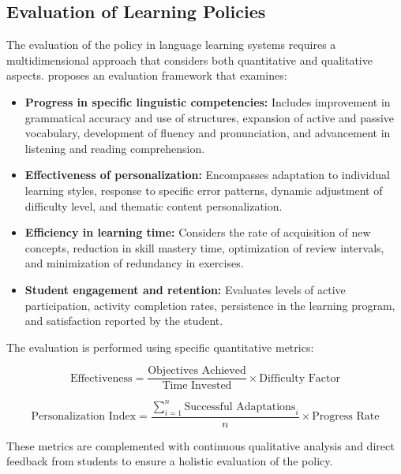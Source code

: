 \subsection{Evaluation of Learning Policies}

The evaluation of the \gls{policy} in language learning systems requires a multidimensional approach that considers both quantitative and qualitative aspects. \cite{williams2017educational} proposes an evaluation framework that examines:

\begin{itemize}
  \item \textbf{Progress in specific linguistic competencies:} Includes improvement in grammatical accuracy and use of structures, expansion of active and passive vocabulary, development of fluency and pronunciation, and advancement in listening and reading comprehension.

  \item \textbf{Effectiveness of personalization:} Encompasses adaptation to individual learning styles, response to specific error patterns, dynamic adjustment of difficulty level, and thematic content personalization.

  \item \textbf{Efficiency in learning time:} Considers the rate of acquisition of new concepts, reduction in skill mastery time, optimization of review intervals, and minimization of redundancy in exercises.

  \item \textbf{Student engagement and retention:} Evaluates levels of active participation, activity completion rates, persistence in the learning program, and satisfaction reported by the student.
\end{itemize}

The evaluation is performed using specific quantitative metrics:

\begin{equation}
  \text{Effectiveness} = \frac{\text{Objectives Achieved}}{\text{Time Invested}} \times \text{Difficulty Factor}
\end{equation}

\begin{equation}
  \text{Personalization Index} = \frac{\sum_{i=1}^{n} \text{Successful Adaptations}_i}{n} \times \text{Progress Rate}
\end{equation}

These metrics are complemented with continuous qualitative analysis and direct feedback from students to ensure a holistic evaluation of the \gls{policy}.


